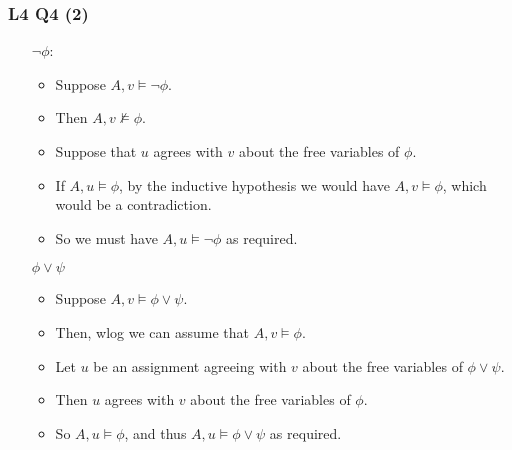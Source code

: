 \documentclass[handout]{beamer}
\begin{document}
\begin{frame}
\frametitle{L4 Q4 (2)}
\begin{itemize}
\item[$\neg \phi$:]  \begin{itemize}
\item Suppose $A ,v\models \neg \phi$.\vspace{0.1cm} 
\item Then $A, v\not\models \phi$. \vspace{0.1cm} 
\item Suppose that $u$ agrees with $v$ about the free variables of $\phi$. \vspace{0.1cm} 
\item If $A,u\models \phi$, by the inductive hypothesis we would have $A, v\models \phi$, which would be a contradiction. \vspace{0.1cm} 
\item So we must have $A, u\models \neg\phi$ as required.
\end{itemize}\vspace{0.6cm}
\item[$\phi\vee\psi$] \begin{itemize}
\item Suppose $A,v\models \phi\vee\psi$. \vspace{0.1cm} 
\item Then, wlog we can assume that $A,v\models \phi$. \vspace{0.1cm} 
\item Let $u$ be an assignment agreeing with $v$ about the free variables of $\phi\vee\psi$. \vspace{0.1cm} 
\item Then $u$ agrees with $v$ about the free variables of $\phi$. \vspace{0.1cm} 
\item So $A, u\models \phi$, and thus $A,u\models \phi\vee\psi$ as required.
\end{itemize}
\end{itemize}
\end{frame}
\end{document}
